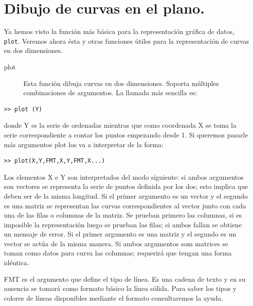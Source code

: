 \section{Dibujo de curvas en el plano.\label{sec:Curvas-y-funciones.}}

Ya hemos visto la función más básica para la representación gráfica
de datos, \texttt{plot}. Veremos ahora ésta y otras funciones útiles
para la representación de curvas en dos dimensiones.

\begin{description}
\item [plot\texttt{}]Esta función dibuja curvas en dos dimensiones.
Soporta múltiples combinaciones de argumentos. La llamada más sencilla
es:
\end{description}
\begin{verbatim}
>> plot (Y)
\end{verbatim}
donde Y es la serie de ordenadas mientras que como coordenada X se
toma la serie correspondiente a contar los puntos empezando desde
1. Si queremos pasarle más argumentos plot los va a interpretar de
la forma: 

\begin{verbatim}
>> plot(X,Y,FMT,X,Y,FMT,X...)
\end{verbatim}
Los elementos X e Y son interpretados del modo siguiente: si ambos
argumentos son vectores se representa la serie de puntos definida
por los dos; esto implica que deben ser de la misma longitud. Si el
primer argumento es un vector y el segundo es una matriz se representan
las curvas correspondientes al vector junto con cada una de las filas
o columnas de la matriz. Se prueban primero las columnas, si es imposible
la representación luego se prueban las filas; si ambos fallan se obtiene
un mensaje de error. Si el primer argumento es una matriz y el segundo
es un vector se actúa de la misma manera. Si ambos argumentos som
matrices se toman como datos para curva las columnas; requerirá que
tengan una forma idéntica.

FMT es el argumento que define el tipo de línea. Es una cadena de
texto y en su ausencia se tomará como formato básico la línea sólida.
Para saber los tipos y colores de líneas disponibles mediante el formato
consultaremos la ayuda.

